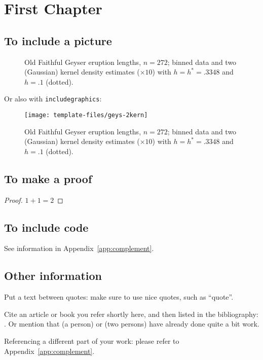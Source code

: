 \chapter{First Chapter}

\section{To include a picture}
\begin{figure}[hbt!]%
  \caption[Geyser data: binned histogram, Silverman's and another
    kernel]%
  {Old Faithful Geyser eruption lengths, $n=272$; binned data and two
    (Gaussian) kernel density estimates ($\times 10$) with $h=h^*= .3348$
    and $h= .1$ (dotted).}%
  \label{fig:geys1}
\end{figure}

Or also with \texttt{includegraphics}:
\begin{figure}[hbt!]%
  \centering
  \texttt{[image: template-files/geys-2kern]} %
  \caption[Geyser data: binned histogram, Silverman's and another
    kernel]%
  {Old Faithful Geyser eruption lengths, $n=272$; binned data and two
    (Gaussian) kernel density estimates ($\times 10$) with $h=h^*= .3348$
    and $h= .1$ (dotted).}%
  \label{fig:geys2}
\end{figure}

\section{To make a proof}
\begin{proof}
  $1 + 1 = 2$
\end{proof}

\section{To include \Rp code}
See information in Appendix~\ref{app:complement}.


\section{Other information}
Put a text between quotes: make sure to use nice quotes, such as ``quote''.

Cite an article or book you refer shortly here, and then listed in the bibliography: \cite{ReferenceKey}.
Or mention that \citeauthor{HamF85} (a person) or \citeauthor{StaWW91} (two
persons) have already done quite a bit work.

Referencing a different part of your work: please refer to Appendix~\ref{app:complement}.


